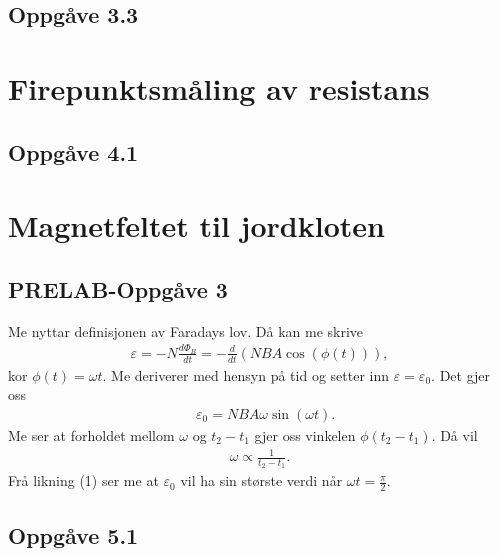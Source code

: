 \documentclass[11pt, a4paper]{article}
\begin{document}
  \subsection*{Oppgåve 3.3}





\newpage




\section*{Firepunktsmåling av resistans}


  \subsection*{Oppgåve 4.1}




\newpage




\section*{Magnetfeltet til jordkloten}


  \subsection*{PRELAB-Oppgåve 3}
    Me nyttar definisjonen av Faradays lov. Då kan me skrive
    \begin{align*}
      \varepsilon = -N\frac{d\Phi_{B}}{dt} = -\frac{d}{dt}\left( NBA\cos(\phi(t)) \right),
    \end{align*}
    kor $\phi(t) = \omega t$. Me deriverer med hensyn på tid og setter inn $\varepsilon = \varepsilon_0$. Det gjer oss
    \begin{align}
      &\varepsilon_0 = NBA\omega\sin(\omega t).
    \end{align}
    Me ser at forholdet mellom $\omega$ og $t_2 - t_1$ gjer oss vinkelen $\phi(t_2 - t_1)$. Då vil
    \begin{align*}
      \omega \propto \frac{1}{t_2 - t_1}.
    \end{align*}
    Frå likning (1) ser me at $\varepsilon_0$ vil ha sin største verdi når $\omega t = \frac{\pi}{2}$.



  \subsection*{Oppgåve 5.1}
\end{document}
